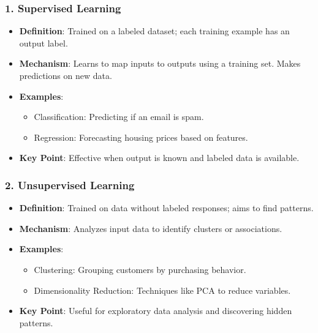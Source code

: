 \documentclass[aspectratio=169]{beamer}
\begin{document}
\begin{frame}[fragile]
    \frametitle{1. Supervised Learning}
    \begin{itemize}
        \item \textbf{Definition}: Trained on a labeled dataset; each training example has an output label.
        \item \textbf{Mechanism}: Learns to map inputs to outputs using a training set. Makes predictions on new data.
        \item \textbf{Examples}:
        \begin{itemize}
            \item Classification: Predicting if an email is spam.
            \item Regression: Forecasting housing prices based on features.
        \end{itemize}
        \item \textbf{Key Point}: Effective when output is known and labeled data is available.
    \end{itemize}
\end{frame}

\begin{frame}[fragile]
    \frametitle{2. Unsupervised Learning}
    \begin{itemize}
        \item \textbf{Definition}: Trained on data without labeled responses; aims to find patterns.
        \item \textbf{Mechanism}: Analyzes input data to identify clusters or associations.
        \item \textbf{Examples}:
        \begin{itemize}
            \item Clustering: Grouping customers by purchasing behavior.
            \item Dimensionality Reduction: Techniques like PCA to reduce variables.
        \end{itemize}
        \item \textbf{Key Point}: Useful for exploratory data analysis and discovering hidden patterns.
    \end{itemize}
\end{frame}
\end{document}

